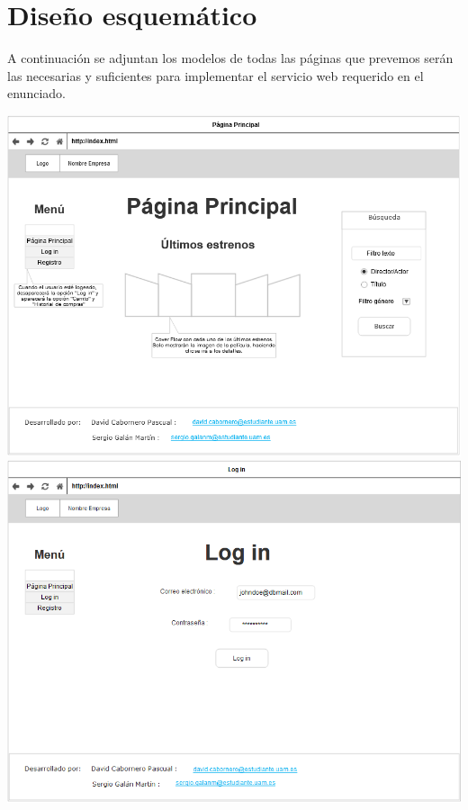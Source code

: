 \documentclass[]{article}
\begin{document}
\section{Diseño esquemático}

A continuación se adjuntan los modelos de todas las páginas que prevemos serán las necesarias y suficientes para implementar el servicio web requerido en el enunciado.
\begin{center}

\includegraphics[scale=0.5]{mockup/PaginaPrincipal.png}
\includegraphics[scale=0.5]{mockup/LogIn.png}

\end{center}
\end{document}
